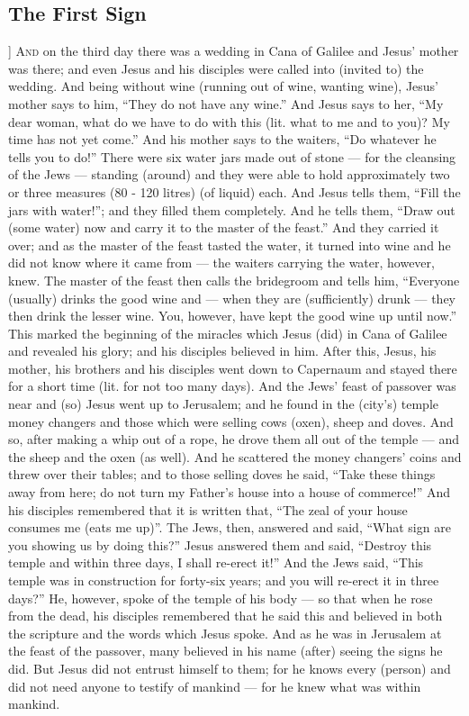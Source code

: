 \begin{pages}
\begin{Leftside}
        			\chapter{The First Sign}
        			]
        		\renewcommand\LettrineFontHook{\Zallmanfamily}
		\lettrine[lines=3]{A}{nd} on the third day there was a wedding in Cana of Galilee and Jesus’ mother was there; and even Jesus and his disciples were called into (invited to) the wedding. And being without wine (running out of wine, wanting wine), Jesus’ mother says to him, “They do not have any wine.” And Jesus says to her, “My dear woman, what do we have to do with this (lit. what to me and to you)? My time has not yet come.” And his mother says to the waiters, “Do whatever he tells you to do!” There were six water jars made out of stone — for the cleansing of the Jews — standing (around) and they were able to hold approximately two or three measures (80 - 120 litres) (of liquid) each. And Jesus tells them, “Fill the jars with water!”; and they filled them completely. And he tells them, “Draw out (some water) now and carry it to the master of the feast.” And they carried it over; and as the master of the feast tasted the water, it turned into wine and he did not know where it came from — the waiters carrying the water, however, knew. The master of the feast then calls the bridegroom and tells him, “Everyone (usually) drinks the good wine and — when they are (sufficiently) drunk — they then drink the lesser wine. You, however, have kept the good wine up until now.” This marked the beginning of the miracles which Jesus (did) in Cana of Galilee and revealed his glory; and his disciples believed in him. 
		\pend
		\pstart
		After this, Jesus, his mother, his brothers and his disciples went down to Capernaum and stayed there for a short time (lit. for not too many days). And the Jews’ feast of passover was near and (so) Jesus went up to Jerusalem; and he found in the (city’s) temple money changers and those which were selling cows (oxen), sheep and doves. And so, after making a whip out of a rope, he drove them all out of the temple — and the sheep and the oxen (as well). And he scattered the money changers’ coins and threw over their tables; and to those selling doves he said, “Take these things away from here; do not turn my Father’s house into a house of commerce!” And his disciples remembered that it is written that, “The zeal of your house consumes me (eats me up)”. 
		\pend
		\pstart
		The Jews, then, answered and said, “What sign are you showing us by doing this?” Jesus answered them and said, “Destroy this temple and within three days, I shall re-erect it!” And the Jews said, “This temple was in construction for forty-six years; and you will re-erect it in three days?” He, however, spoke of the temple of his body — so that when he rose from the dead, his disciples remembered that he said this and believed in both the scripture and the words which Jesus spoke.  And as he was in Jerusalem at the feast of the passover, many believed in his name (after) seeing the signs he did. But Jesus did not entrust himself to them; for he knows every (person) and did not need anyone to testify of mankind — for he knew what was within mankind. 

\end{Leftside}
\end{pages}
